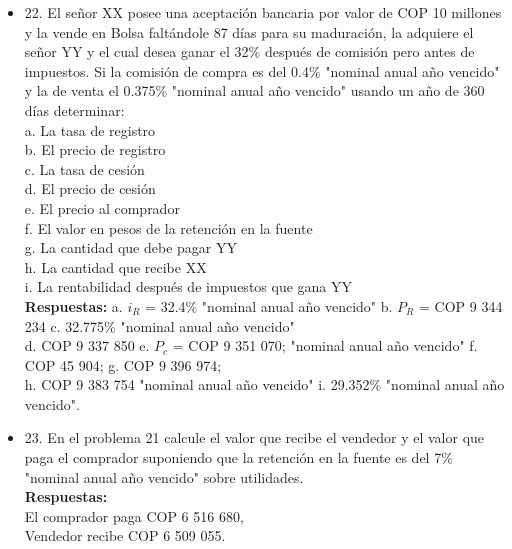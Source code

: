 \begin{itemize}
 \item 22. El señor XX posee una aceptación bancaria por valor de COP 10 millones y la vende en Bolsa faltándole 87 días para su maduración, la adquiere el señor YY y el cual desea ganar el 32\% después de comisión pero antes de impuestos. Si la comisión de compra es del 0.4\% "nominal anual año vencido" y la de venta el 0.375\% "nominal anual año vencido" usando un año de 360 días determinar:\\
       a.	La tasa de registro\\
       b.	El precio de registro\\
       c.	La tasa de cesión\\
       d.	El precio de cesión\\
       e.	El precio al comprador\\
       f.	El valor en pesos de la retención en la fuente\\
       g.	La cantidad que debe pagar YY\\
       h.	La cantidad que recibe XX\\
       i.	La rentabilidad después de impuestos que gana YY\\
       \textbf{Respuestas:} a. $i_{R}$ = 32.4\% "nominal anual año vencido"\hspace{0,5cm}  b. $P_{R}$ = COP 9 344 234\hspace{0,5cm}   c. 32.775\% "nominal anual año vencido"\hspace{0,5cm}  \\
       d. COP 9 337 850\hspace{0,5cm}   e.  $P_{c}$ = COP 9 351 070;  "nominal anual año vencido"\hspace{0,5cm}    f. COP 45 904;  \hspace{0,5cm}   g. COP 9 396 974; \hspace{0,5cm}\\
       h. COP 9 383 754 \hspace{0,5cm} "nominal anual año vencido"\hspace{0,5cm}   i. 29.352\% "nominal anual año vencido".\\
       \medskip

 \item 23. En el problema 21 calcule el valor que recibe el vendedor y el valor que paga el comprador suponiendo que la retención en la fuente es del 7\% "nominal anual año vencido" sobre utilidades.\\
       \textbf{Respuestas:}\\
       El comprador paga COP 6 516 680,\\
       Vendedor recibe COP 6 509 055.\\
       \medskip


\end{itemize}
